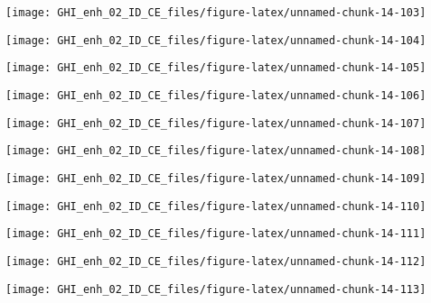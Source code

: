 \documentclass[
  10pt,
  a4paper,oneside]{article}
\begin{document}
\begin{center}\texttt{[image: GHI\_enh\_02\_ID\_CE\_files/figure-latex/unnamed-chunk-14-103]} \end{center}

\begin{center}\texttt{[image: GHI\_enh\_02\_ID\_CE\_files/figure-latex/unnamed-chunk-14-104]} \end{center}

\begin{center}\texttt{[image: GHI\_enh\_02\_ID\_CE\_files/figure-latex/unnamed-chunk-14-105]} \end{center}

\begin{center}\texttt{[image: GHI\_enh\_02\_ID\_CE\_files/figure-latex/unnamed-chunk-14-106]} \end{center}

\begin{center}\texttt{[image: GHI\_enh\_02\_ID\_CE\_files/figure-latex/unnamed-chunk-14-107]} \end{center}

\begin{center}\texttt{[image: GHI\_enh\_02\_ID\_CE\_files/figure-latex/unnamed-chunk-14-108]} \end{center}

\begin{center}\texttt{[image: GHI\_enh\_02\_ID\_CE\_files/figure-latex/unnamed-chunk-14-109]} \end{center}

\begin{center}\texttt{[image: GHI\_enh\_02\_ID\_CE\_files/figure-latex/unnamed-chunk-14-110]} \end{center}

\begin{center}\texttt{[image: GHI\_enh\_02\_ID\_CE\_files/figure-latex/unnamed-chunk-14-111]} \end{center}

\begin{center}\texttt{[image: GHI\_enh\_02\_ID\_CE\_files/figure-latex/unnamed-chunk-14-112]} \end{center}

\begin{center}\texttt{[image: GHI\_enh\_02\_ID\_CE\_files/figure-latex/unnamed-chunk-14-113]} \end{center}
\end{document}
